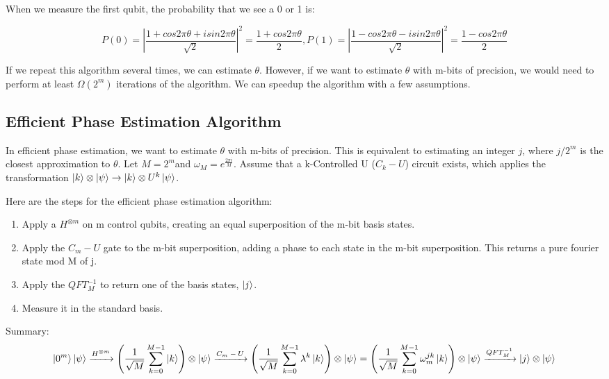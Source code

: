 \documentclass[11pt]{journal}
\begin{document}
When we measure the first qubit, the probability that we see a 0 or 1 is:

\[P(0)=\left|\frac{1 + cos2\pi\theta + isin2\pi\theta}{\sqrt{2}}\right|^2 = \frac{1+cos2\pi\theta}{2}, P(1)=\left|\frac{1 - cos2\pi\theta - isin2\pi\theta}{\sqrt{2}}\right|^2 = \frac{1-cos2\pi\theta}{2}\]

If we repeat this algorithm several times, we can estimate $\theta$. However, if we want to estimate $\theta$ with m-bits of precision, we would need to perform at least $\Omega(2^m)$ iterations of the algorithm. We can speedup the algorithm with a few assumptions\cite{vaz}.

\subsection{Efficient Phase Estimation Algorithm}

In efficient phase estimation, we want to estimate $\theta$ with m-bits of precision. This is equivalent to estimating an integer $j$, where $j/2^m$ is the closest approximation to $\theta$. Let $M=2^m$and $\omega_M=e^{\frac{2\pi i}{M}}$. Assume that a k-Controlled U ($C_k-U$) circuit exists, which applies the transformation $\ket{k}\otimes\ket{\psi} \rightarrow \ket{k} \otimes U^k\ket{\psi}$.


Here are the steps for the efficient phase estimation algorithm:

\begin{enumerate}
    \item Apply a $H^{\otimes m}$ on m control qubits, creating an equal superposition of the m-bit basis states.
    
    \item Apply the $C_m-U$ gate to the m-bit superposition, adding a phase to each state in the m-bit superposition. This returns a pure fourier state mod M of j.
    
    \item Apply the $QFT_M^{-1}$ to return one of the basis states, $\ket{j}$.
    
    \item Measure it in the standard basis.
\end{enumerate}

Summary:
\[\ket{0^{m}} \ket{\psi} \xrightarrow{\text{$H^{\otimes m}$}} \left(\frac{1}{\sqrt{M}}\sum_{k=0}^{M-1}\ket{k}\right)\otimes\ket{\psi}\xrightarrow{\text{$C_m-U$}} \left(\frac{1}{\sqrt{M}}\sum_{k=0}^{M-1}\lambda^k\ket{k}\right)\otimes\ket{\psi}=\left(\frac{1}{\sqrt{M}}\sum_{k=0}^{M-1}\omega_m^{jk}\ket{k}\right)\otimes\ket{\psi}\xrightarrow{\text{$QFT_M^{-1}$}} \ket{j} \otimes \ket{\psi}\]
\end{document}
